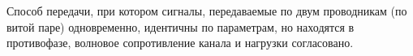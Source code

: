 Способ передачи, при котором сигналы, передаваемые по двум
проводникам (по витой паре) одновременно, идентичны по 
параметрам, но находятся в противофазе, волновое 
сопротивление канала и нагрузки согласовано.